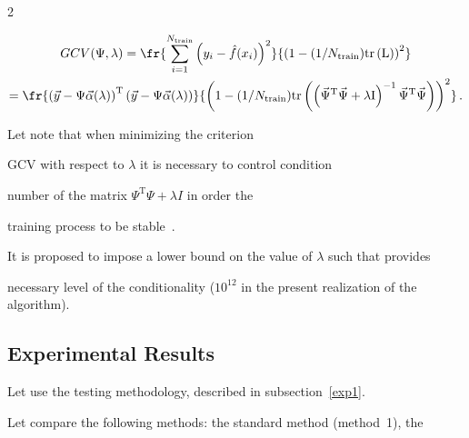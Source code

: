 \begin{multicols}{2}
\noindent

\begin{multline*}


  GCV(\Psi, \lambda) = %

    \fr{\sum\limits_{i=1}^{N_{\mathrm{train}}} \left( y_i - \hat f(x_i)\right)^2 }

    {\left( 1 - ({1}/N_{\mathrm{train}}) \mathrm{tr}\left( \mathrm{L}  \right) \right)^2  }\\

   = %

    \fr{\left(\vec y - \Psi \vec \alpha(\lambda)\right)^{\mathrm{T}} 

    \left(\vec y - \Psi \vec \alpha(\lambda)\right)}

    {\left( 1 - ({1}/{N_{\mathrm{train}}})\mathrm{tr}\left(  

     \left( \vec{\Psi}^{\mathrm{T}} \vec{\Psi} + \lambda \mathrm{I} \right)^{-1} 

     \vec{\Psi}^{\mathrm{T}} \vec{\Psi}  \right) \right)^2  }\,.

\end{multline*}

Let  note that when minimizing the criterion

GCV with respect to $\lambda$ it is necessary to control condition 

number of the matrix $\Psi^{\mathrm{T}}\Psi + \lambda I$ in order the 

training process to be stable~\cite{oldRegul}.

It is proposed to impose a lower bound on the value of $\lambda$ such that provides

necessary level of the conditionality ($10^{12}$ in the present realization of the algorithm).







\subsection{Experimental Results}

\label{exp2}



\noindent

Let use the testing methodology, described in subsection~\ref{exp1}.

Let compare the following methods: the standard method (method~1), the 


\end{multicols}
